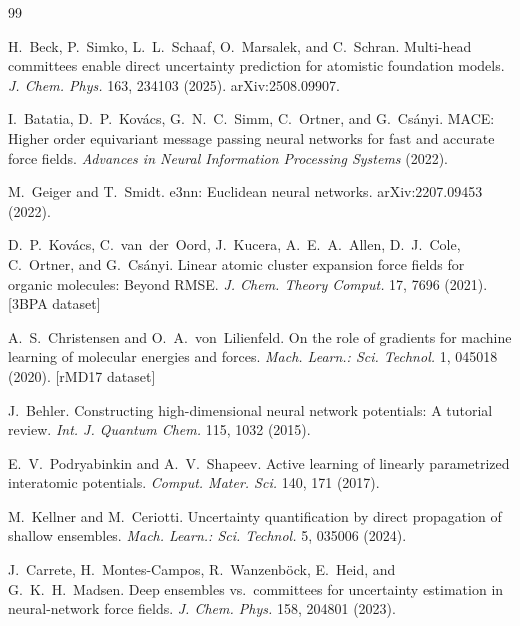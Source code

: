 \begin{thebibliography}{99}

H.~Beck, P.~Simko, L.~L.~Schaaf, O.~Marsalek, and C.~Schran.
\newblock Multi-head committees enable direct uncertainty prediction for atomistic foundation models.
\newblock \emph{J. Chem. Phys.} 163, 234103 (2025). arXiv:2508.09907.

I.~Batatia, D.~P.~Kov\'acs, G.~N.~C.~Simm, C.~Ortner, and G.~Cs\'anyi.
\newblock MACE: Higher order equivariant message passing neural networks for fast and accurate force fields.
\newblock \emph{Advances in Neural Information Processing Systems} (2022).

M.~Geiger and T.~Smidt.
\newblock e3nn: Euclidean neural networks.
\newblock arXiv:2207.09453 (2022).

D.~P.~Kov\'acs, C.~van~der~Oord, J.~Kucera, A.~E.~A.~Allen, D.~J.~Cole, C.~Ortner, and G.~Cs\'anyi.
\newblock Linear atomic cluster expansion force fields for organic molecules: Beyond RMSE.
\newblock \emph{J. Chem. Theory Comput.} 17, 7696 (2021). [3BPA dataset]

A.~S.~Christensen and O.~A.~von~Lilienfeld.
\newblock On the role of gradients for machine learning of molecular energies and forces.
\newblock \emph{Mach. Learn.: Sci. Technol.} 1, 045018 (2020). [rMD17 dataset]

J.~Behler.
\newblock Constructing high-dimensional neural network potentials: A tutorial review.
\newblock \emph{Int. J. Quantum Chem.} 115, 1032 (2015).

E.~V.~Podryabinkin and A.~V.~Shapeev.
\newblock Active learning of linearly parametrized interatomic potentials.
\newblock \emph{Comput. Mater. Sci.} 140, 171 (2017).

M.~Kellner and M.~Ceriotti.
\newblock Uncertainty quantification by direct propagation of shallow ensembles.
\newblock \emph{Mach. Learn.: Sci. Technol.} 5, 035006 (2024).

J.~Carrete, H.~Montes-Campos, R.~Wanzenb\"ock, E.~Heid, and G.~K.~H.~Madsen.
\newblock Deep ensembles vs.\ committees for uncertainty estimation in neural-network force fields.
\newblock \emph{J. Chem. Phys.} 158, 204801 (2023).


\end{thebibliography}
